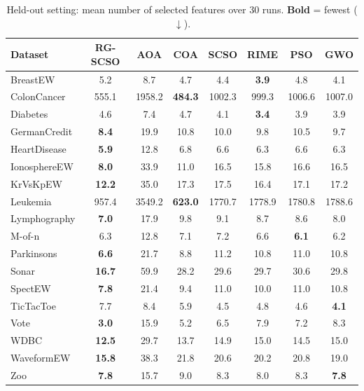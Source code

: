 \begin{table}[t]
\centering
\caption{Held-out setting: mean number of selected features over 30 runs. \textbf{Bold} = fewest ($\downarrow$).}
\label{tab:heldout_nfeat}
\footnotesize
\begin{tabular}{lccccccc}
\toprule
Dataset & RG-SCSO & AOA & COA & SCSO & RIME & PSO & GWO \\
\midrule
BreastEW & 5.2 & 8.7 & 4.7 & 4.4 & \textbf{3.9} & 4.8 & 4.1 \\
ColonCancer & 555.1 & 1958.2 & \textbf{484.3} & 1002.3 & 999.3 & 1006.6 & 1007.0 \\
Diabetes & 4.6 & 7.4 & 4.7 & 4.1 & \textbf{3.4} & 3.9 & 3.9 \\
GermanCredit & \textbf{8.4} & 19.9 & 10.8 & 10.0 & 9.8 & 10.5 & 9.7 \\
HeartDisease & \textbf{5.9} & 12.8 & 6.8 & 6.6 & 6.3 & 6.6 & 6.3 \\
IonosphereEW & \textbf{8.0} & 33.9 & 11.0 & 16.5 & 15.8 & 16.6 & 16.5 \\
KrVsKpEW & \textbf{12.2} & 35.0 & 17.3 & 17.5 & 16.4 & 17.1 & 17.2 \\
Leukemia & 957.4 & 3549.2 & \textbf{623.0} & 1770.7 & 1778.9 & 1780.8 & 1788.6 \\
Lymphography & \textbf{7.0} & 17.9 & 9.8 & 9.1 & 8.7 & 8.6 & 8.0 \\
M-of-n & 6.3 & 12.8 & 7.1 & 7.2 & 6.6 & \textbf{6.1} & 6.2 \\
Parkinsons & \textbf{6.6} & 21.7 & 8.8 & 11.2 & 10.8 & 11.0 & 10.8 \\
Sonar & \textbf{16.7} & 59.9 & 28.2 & 29.6 & 29.7 & 30.6 & 29.8 \\
SpectEW & \textbf{7.8} & 21.4 & 9.4 & 11.0 & 10.0 & 11.0 & 10.8 \\
TicTacToe & 7.7 & 8.4 & 5.9 & 4.5 & 4.8 & 4.6 & \textbf{4.1} \\
Vote & \textbf{3.0} & 15.9 & 5.2 & 6.5 & 7.9 & 7.2 & 8.3 \\
WDBC & \textbf{12.5} & 29.7 & 13.7 & 14.9 & 15.0 & 14.5 & 15.0 \\
WaveformEW & \textbf{15.8} & 38.3 & 21.8 & 20.6 & 20.2 & 20.8 & 19.0 \\
Zoo & \textbf{7.8} & 15.7 & 9.0 & 8.3 & 8.0 & 8.3 & \textbf{7.8} \\
\bottomrule
\end{tabular}
\end{table}
